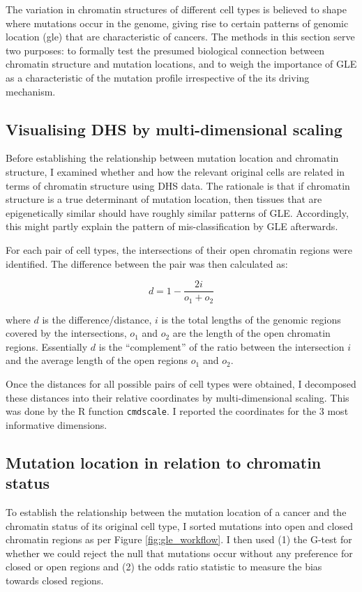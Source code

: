 The variation in chromatin structures of different cell types is believed to shape where mutations occur in the genome, giving rise to certain patterns of genomic location (\gls{gle}) that are characteristic of cancers. The methods in this section serve two purposes: to formally test the presumed biological connection between chromatin structure and mutation locations, and to weigh the importance of GLE as a characteristic of the mutation profile irrespective of the its driving mechanism.  

\subsection{Visualising DHS by multi-dimensional scaling}\label{methods:encode_pca}
Before establishing the relationship between mutation location and chromatin structure, I examined whether and how the relevant original cells are related in terms of chromatin structure using DHS data. The rationale is that if chromatin structure is a true determinant of mutation location, then tissues that are epigenetically similar should have roughly similar patterns of GLE. Accordingly, this might partly explain the pattern of mis-classification by GLE afterwards.

For each pair of cell types, the intersections of their open chromatin regions were identified. The difference between the pair was then calculated as:

\begin{equation}
    d = 1 - \frac{2i}{o_1 + o_2}
\end{equation}

where $d$ is the difference/distance, $i$ is the total lengths of the genomic regions covered by the intersections, $o_1$ and $o_2$ are the length of the open chromatin regions. Essentially $d$ is the ``complement'' of the ratio between the intersection $i$ and the average length of the open regions $o_1$ and $o_2$. 

Once the distances for all possible pairs of cell types were obtained, I decomposed these distances into their relative coordinates by multi-dimensional scaling. This was done by the R function \texttt{cmdscale}. I reported the coordinates for the 3 most informative dimensions. %

\subsection{Mutation location in relation to chromatin status}
To establish the relationship between the mutation location of a cancer and the chromatin status of its original cell type, I sorted mutations into open and closed chromatin regions as per Figure \ref{fig:gle_workflow}. I then used (1) the G-test for whether we could reject the null that mutations occur without any preference for closed or open regions and (2) the odds ratio statistic to measure the bias towards closed regions.

